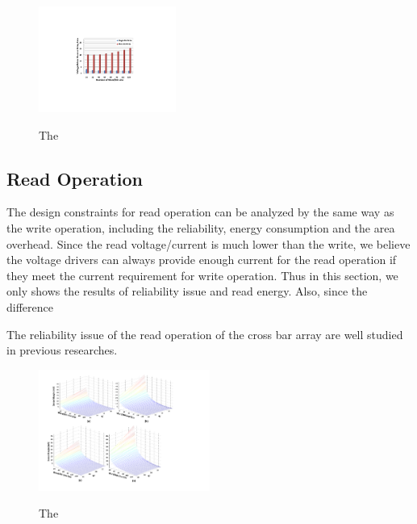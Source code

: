 \begin{figure}%
\centering
  \includegraphics[width=0.4\textwidth]{./figures/Area_kr20.pdf}\\
  \caption{The}\label{fig:Area_kr20}
\end{figure}
\subsection{Read Operation}
The design constraints for read operation can be analyzed by the same way as the write operation, including the reliability, energy consumption and the area overhead. Since the read voltage/current is much lower than the write, we believe the voltage drivers can always provide enough current for the read operation if they meet the current requirement for write operation. Thus in this section, we only shows the results of reliability issue and read energy. Also, since the difference

The reliability issue of the read operation of the cross bar array are well studied in previous researches.
%

%

\begin{figure}%
\centering
  \includegraphics[width=0.5\textwidth]{./figures/sense_margin2}\\
  \caption{The}\label{fig:sense_margin}
\end{figure} 